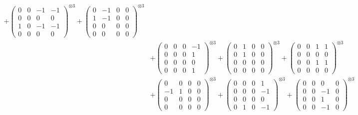 \documentclass{article}
\begin{document}
{\begin{align}
            + \begin{pmatrix} 0 & 0 & -1 & -1 \\ 0 & 0 & 0 & 0 \\ 1 & 0 & -1 & -1 \\ 0 & 0 & 0 & 0 \end{pmatrix}^{\otimes 3} 
            + \begin{pmatrix} 0 & -1 & 0 & 0 \\ 1 & -1 & 0 & 0 \\ 0 & 0 & 0 & 0 \\ 0 & 0 & 0 & 0 \end{pmatrix}^{\otimes 3} \\
        &+ \label{Rs16-Rc11-Solution-5-c10} \begin{pmatrix} 0 & 0 & 0 & -1 \\ 0 & 0 & 0 & 1 \\ 0 & 0 & 0 & 0 \\ 0 & 0 & 0 & 1 \end{pmatrix}^{\otimes 3} 
            + \begin{pmatrix} 0 & 1 & 0 & 0 \\ 0 & 1 & 0 & 0 \\ 0 & 0 & 0 & 0 \\ 0 & 0 & 0 & 0 \end{pmatrix}^{\otimes 3} 
            + \begin{pmatrix} 0 & 0 & 1 & 1 \\ 0 & 0 & 0 & 0 \\ 0 & 0 & 1 & 1 \\ 0 & 0 & 0 & 0 \end{pmatrix}^{\otimes 3} \\
        &+ \label{Rs16-Rc11-Solution-5-c13} \begin{pmatrix} 0 & 0 & 0 & 0 \\ -1 & 1 & 0 & 0 \\ 0 & 0 & 0 & 0 \\ 0 & 0 & 0 & 0 \end{pmatrix}^{\otimes 3} 
            + \begin{pmatrix} 0 & 0 & 0 & 1 \\ 0 & 0 & 0 & -1 \\ 0 & 0 & 0 & 0 \\ 0 & 1 & 0 & -1 \end{pmatrix}^{\otimes 3} 
            + \begin{pmatrix} 0 & 0 & 0 & 0 \\ 0 & 0 & -1 & 0 \\ 0 & 0 & 1 & 0 \\ 0 & 0 & -1 & 0 \end{pmatrix}^{\otimes 3} \\

\end{align}}
\end{document}
